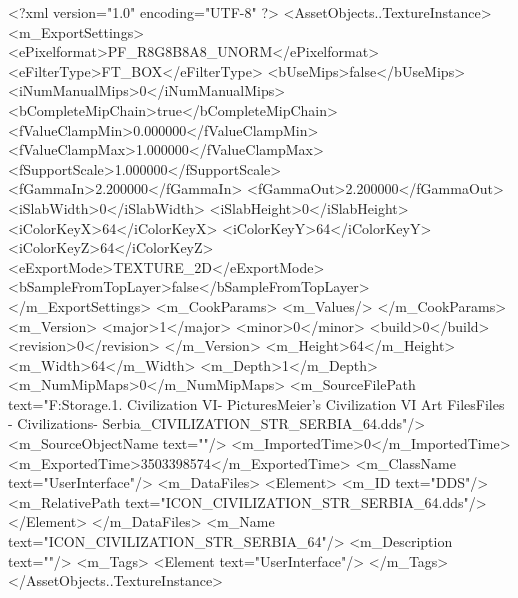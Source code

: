 <?xml version="1.0" encoding="UTF-8" ?>
<AssetObjects..TextureInstance>
	<m_ExportSettings>
		<ePixelformat>PF_R8G8B8A8_UNORM</ePixelformat>
		<eFilterType>FT_BOX</eFilterType>
		<bUseMips>false</bUseMips>
		<iNumManualMips>0</iNumManualMips>
		<bCompleteMipChain>true</bCompleteMipChain>
		<fValueClampMin>0.000000</fValueClampMin>
		<fValueClampMax>1.000000</fValueClampMax>
		<fSupportScale>1.000000</fSupportScale>
		<fGammaIn>2.200000</fGammaIn>
		<fGammaOut>2.200000</fGammaOut>
		<iSlabWidth>0</iSlabWidth>
		<iSlabHeight>0</iSlabHeight>
		<iColorKeyX>64</iColorKeyX>
		<iColorKeyY>64</iColorKeyY>
		<iColorKeyZ>64</iColorKeyZ>
		<eExportMode>TEXTURE_2D</eExportMode>
		<bSampleFromTopLayer>false</bSampleFromTopLayer>
	</m_ExportSettings>
	<m_CookParams>
		<m_Values/>
	</m_CookParams>
	<m_Version>
		<major>1</major>
		<minor>0</minor>
		<build>0</build>
		<revision>0</revision>
	</m_Version>
	<m_Height>64</m_Height>
	<m_Width>64</m_Width>
	<m_Depth>1</m_Depth>
	<m_NumMipMaps>0</m_NumMipMaps>
	<m_SourceFilePath text="F:\Mod Storage\2.1. Civilization VI\Mods\Archive - Pictures\Sid Meier's Civilization VI Art Files\Art Files - Civilizations\Civilization - Serbia\ICON_CIVILIZATION_STR_SERBIA_64.dds"/>
	<m_SourceObjectName text=""/>
	<m_ImportedTime>0</m_ImportedTime>
	<m_ExportedTime>3503398574</m_ExportedTime>
	<m_ClassName text="UserInterface"/>
	<m_DataFiles>
		<Element>
			<m_ID text="DDS"/>
			<m_RelativePath text="ICON_CIVILIZATION_STR_SERBIA_64.dds"/>
		</Element>
	</m_DataFiles>
	<m_Name text="ICON_CIVILIZATION_STR_SERBIA_64"/>
	<m_Description text=""/>
	<m_Tags>
		<Element text="UserInterface"/>
	</m_Tags>
</AssetObjects..TextureInstance>

